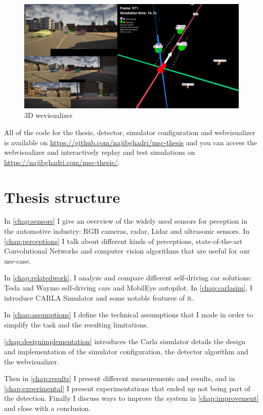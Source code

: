 \begin{figure}[!ht]
    \centering
    \includegraphics[width=150mm, keepaspectratio]{figures/webviz2.png}
    \caption{3D wevisualizer}
    \label{fig:webviz1}
\end{figure}

All of the code for the thesis, detector, simulator configuration and
webvisualizer is available on \url{https://github.com/najibghadri/msc-thesis}
and you can access the webvisualizer and interactively replay and test
simulations on \url{https://najibghadri.com/msc-thesis/}.


\section{Thesis structure}

In \autoref{chap:sensors} I give an overview of the widely used sensors for
peception in the automotive industry: RGB cameras, radar, Lidar and ultrasonic
sensors. In \autoref{chap:perceptions} I talk about different kinds of
perceptions, state-of-the-art Convolutional Networks and computer vision
algorithms that are useful for our use-case.

In \autoref{chap:relatedwork}, I analyze and compare different self-driving  car
solutions: Tesla and Waymo self-driving cars and MobilEye autopilot. In
\autoref{chap:carlasim}, I introduce CARLA Simulator and some notable features
of it.

In \autoref{chap:assumptions} I define the technical assumptions that I made in
order to simplify the task and the resulting limitations.

\autoref{chap:designimplementation} introduces the Carla simulator details the
design and implementation of the simulator configuration, the detector algorithm
and the webvisualizer.

Then in \autoref{chap:results} I present different measurements and results, and
in \autoref{chap:experimental} I present experimentations that ended up not
being part of the detection. Finally I discuss ways to improve the system in
\autoref{chap:improvement} and close with a conclusion.